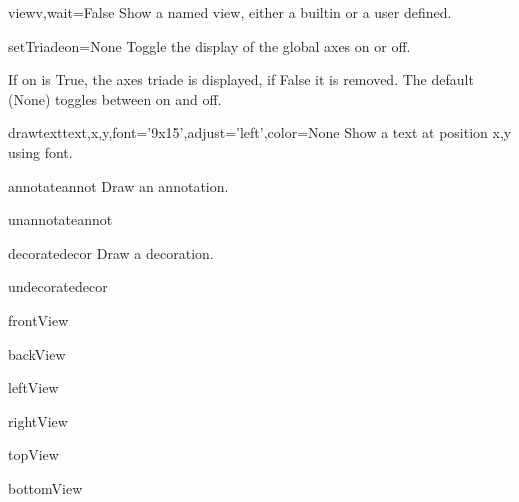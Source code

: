 \begin{funcdesc}{view}{v,wait=False}
Show a named view, either a builtin or a user defined.
\end{funcdesc}

\begin{funcdesc}{setTriade}{on=None}
Toggle the display of the global axes on or off.

If on is True, the axes triade is displayed, if False it is
removed. The default (None) toggles between on and off.

\end{funcdesc}

\begin{funcdesc}{drawtext}{text,x,y,font='9x15',adjust='left',color=None}
Show a text at position x,y using font.
\end{funcdesc}

\begin{funcdesc}{annotate}{annot}
Draw an annotation.
\end{funcdesc}

\begin{funcdesc}{unannotate}{annot}
\end{funcdesc}

\begin{funcdesc}{decorate}{decor}
Draw a decoration.
\end{funcdesc}

\begin{funcdesc}{undecorate}{decor}
\end{funcdesc}

\begin{funcdesc}{frontView}{}
\end{funcdesc}

\begin{funcdesc}{backView}{}
\end{funcdesc}

\begin{funcdesc}{leftView}{}
\end{funcdesc}

\begin{funcdesc}{rightView}{}
\end{funcdesc}

\begin{funcdesc}{topView}{}
\end{funcdesc}

\begin{funcdesc}{bottomView}{}
\end{funcdesc}

